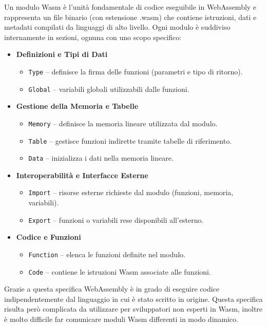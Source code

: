 Un modulo Wasm è l'unità fondamentale di codice eseguibile in WebAssembly e rappresenta un file binario (con estensione .wasm) che contiene istruzioni, dati e metadati compilati da linguaggi di alto livello. Ogni modulo è suddiviso internamente in sezioni, ognuna con uno scopo specifico:
\begin{itemize}
    \item \textbf{Definizioni e Tipi di Dati}
    \begin{itemize}
        \item \texttt{Type} -- definisce la firma delle funzioni (parametri e tipo di ritorno).
        \item \texttt{Global} -- variabili globali utilizzabili dalle funzioni.
    \end{itemize}
    
    \item \textbf{Gestione della Memoria e Tabelle}
    \begin{itemize}
        \item \texttt{Memory} -- definisce la memoria lineare utilizzata dal modulo.
        \item \texttt{Table} -- gestisce funzioni indirette tramite tabelle di riferimento.
        \item \texttt{Data} -- inizializza i dati nella memoria lineare.
    \end{itemize}
    
    \item \textbf{Interoperabilità e Interfacce Esterne}
    \begin{itemize}
        \item \texttt{Import} -- risorse esterne richieste dal modulo (funzioni, memoria, variabili).
        \item \texttt{Export} -- funzioni o variabili rese disponibili all'esterno.
    \end{itemize}
    
    \item \textbf{Codice e Funzioni}
    \begin{itemize}
        \item \texttt{Function} -- elenca le funzioni definite nel modulo.
        \item \texttt{Code} -- contiene le istruzioni Wasm associate alle funzioni.
    \end{itemize}
\end{itemize}

Grazie a questa specifica WebAssembly è in grado di eseguire codice indipendentemente dal linguaggio in cui è stato scritto in origine. Questa specifica risulta però complicata da utilizzare per sviluppatori non esperti in Wasm, inoltre è molto difficile far comunicare moduli Wasm differenti in modo dinamico.

